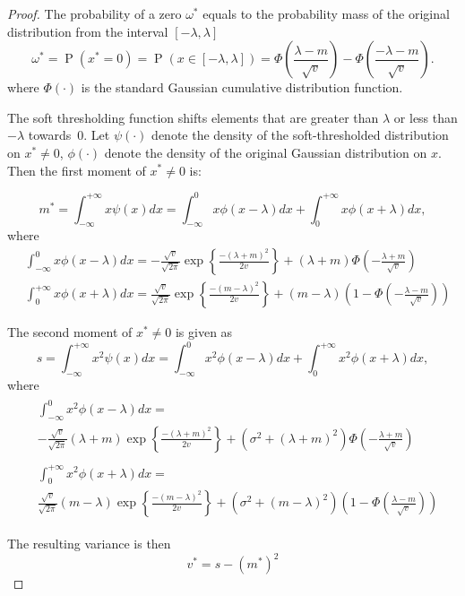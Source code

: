 \documentclass{article}
\begin{document}
\begin{proof}

The probability of a zero $\omega^*$ equals to the probability mass of the original distribution from the interval $[-\lambda, \lambda]$
\begin{equation}
\omega^* =\operatorname{P}(x^*=0) = \operatorname{P}(x \in [-\lambda, \lambda]) = \Phi\left(\frac{\lambda-m}{\sqrt{v}}\right) - \Phi\left(\frac{-\lambda-m}{\sqrt{v}}\right).
\end{equation}
where $\Phi(\cdot)$ is the standard Gaussian cumulative distribution function.

The soft thresholding function shifts elements that are greater than $\lambda$  or less than $-\lambda$ towards~$0$. Let $\psi(\cdot)$ denote the density of the soft-thresholded distribution on $x^* \neq 0$, $\phi(\cdot)$ denote the density of the original Gaussian distribution on $x$. Then the first moment of $x^* \neq 0$ is:

\begin{equation}
\label{eq:thr_first_moment}
m^* = \int_{-\infty}^{+\infty}x\psi(x)dx= \int_{-\infty}^{0}x\phi(x-\lambda)dx + \int_{0}^{+\infty}x\phi(x+\lambda)dx,
\end{equation}
where
\begin{align}
&\int_{-\infty}^{0}x\phi(x-\lambda)dx = -\frac{\sqrt{v}}{\sqrt{2\pi}} \exp\left\{\frac{-(\lambda+m)^2}{2v}\right\} + (\lambda+m)\Phi\left(-\frac{\lambda+m}{\sqrt{v}}\right)\\
&\int_{0}^{+\infty}x\phi(x+\lambda)dx = \frac{\sqrt{v}}{\sqrt{2\pi}} \exp\left\{\frac{-(m - \lambda)^2}{2v}\right\} + (m - \lambda)\left(1 - \Phi\left(-\frac{\lambda-m}{\sqrt{v}}\right)\right)
\end{align}

The second moment of $x^* \neq 0$ is given as
\begin{equation}
\label{eq:thr_second_moment}
s = \int_{-\infty}^{+\infty}x^2\psi(x)dx = \int_{-\infty}^{0}x^2\phi(x-\lambda)dx + \int_{0}^{+\infty}x^2\phi(x+\lambda)dx,
\end{equation}
where
\begin{align}
\begin{split}
&\int_{-\infty}^{0}x^2\phi(x-\lambda)dx = \\
&-\frac{\sqrt{v}}{\sqrt{2\pi}} (\lambda+m)\exp\left\{\frac{-(\lambda+m)^2}{2v}\right\} + (\sigma^2 + (\lambda+m)^2)\Phi\left(-\frac{\lambda+m}{\sqrt{v}}\right)
\end{split}\\
\begin{split}
&\int_{0}^{+\infty}x^2\phi(x+\lambda)dx = \\
&\frac{\sqrt{v}}{\sqrt{2\pi}} (m - \lambda)\exp\left\{\frac{-(m - \lambda)^2}{2v}\right\} + (\sigma^2 + (m - \lambda)^2)\left(1 - \Phi\left(\frac{\lambda -m}{\sqrt{v}}\right)\right)
\end{split}
\end{align}

The resulting variance is then
\begin{equation}
v^* = s- (m^*)^2
\end{equation}
\end{proof}
\end{document}
